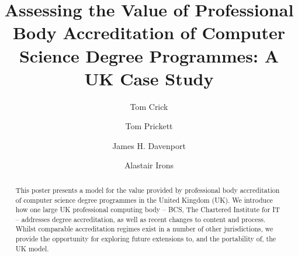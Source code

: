 \documentclass[sigconf]{acmart}
\begin{document}
\fancyhead{}


\title{Assessing the Value of Professional Body Accreditation of
  Computer Science Degree Programmes: A UK Case Study}


\author{Tom Crick}

\author{Tom Prickett}

\author{James H. Davenport}






\author{Alastair Irons}


%
\renewcommand{\shortauthors}{Trovato and Tobin, et al.}

%
\begin{abstract}
This poster presents a model for the value provided by professional
body accreditation of computer science degree programmes in the United
Kingdom (UK). We introduce how one large UK professional computing
body -- BCS, The Chartered Institute for IT -- addresses degree
accreditation, as well as recent changes to content and process. Whilst
comparable accreditation regimes exist in a number of other
jurisdictions, we provide the opportunity for exploring future
extensions to, and the portability of, the UK model.
\end{abstract}
\end{document}
